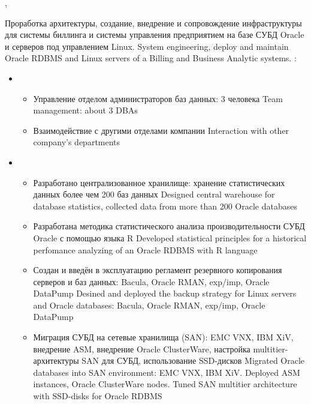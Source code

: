 \documentclass[11pt,a4paper,sans]{moderncv}        %
\begin{document}
{\protect{}}
{\cityperm, \country}
{}
{
	{Проработка архитектуры, создание, внедрение и сопровождение инфраструктуры для системы биллинга и системы управления предприятием на базе СУБД Oracle и серверов под управлением Linux.}
	{System engineering, deploy and maintain Oracle RDBMS and Linux servers of a Billing and Business Analytic systems.}\newline{}
	\achievements:
	\begin{itemize}	
	\item {}	
		\begin{itemize}
			\item {}
				{Управление отделом администраторов баз данных: 3 человека}
				{Team management: about 3 DBAs}
			\item {}
				{Взаимодействие с другими отделами компании}
				{Interaction with other company's departments}
		\end{itemize}
	\item {}
		\begin{itemize}
			\item {}
				{Разработано централизованное хранилище: хранение статистических данных более чем 200 баз данных}
				{Designed central warehouse for database statistics, collected data from more than 200 Oracle databases}
			\item {}
				{Разработана методика статистического анализа производительности СУБД Oracle с помощью языка R}
				{Developed statistical principles for a historical perfomance analyzing of an Oracle RDBMS with R language}
			\item {}
				{Создан и введён в эксплуатацию регламент резервного копирования серверов и баз данных: Bacula, Oracle RMAN, exp/imp, Oracle DataPump}
				{Desined and deployed the backup strategy for Linux servers and Oracle databases: Bacula, Oracle RMAN, exp/imp, Oracle DataPump}
			\item {}
				{Миграция СУБД на сетевые хранилища (SAN): EMC VNX, IBM XiV, внедрение ASM, внедрение Oracle ClusterWare, настройка multitier-архитектуры SAN для СУБД, использование SSD-дисков}
				{Migrated Oracle databases into SAN environment: EMC VNX, IBM XiV. Deployed ASM instances, Oracle ClusterWare nodes. Tuned SAN multitier architecture with SSD-disks for Oracle RDBMS}

\end{itemize}
\end{itemize}}
\end{document}
